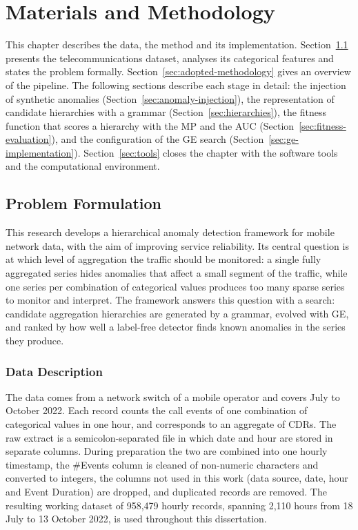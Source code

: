 \chapter{Materials and Methodology}
\label{chap:methodology}

This chapter describes the data, the method and its implementation.
Section~\ref{sec:problem-formulation} presents the telecommunications dataset, analyses its categorical features and states the problem formally.
Section~\ref{sec:adopted-methodology} gives an overview of the pipeline.
The following sections describe each stage in detail: the injection of synthetic anomalies (Section~\ref{sec:anomaly-injection}), the representation of candidate hierarchies with a grammar (Section~\ref{sec:hierarchies}), the fitness function that scores a hierarchy with the \ac{MP} and the \ac{AUC} (Section~\ref{sec:fitness-evaluation}), and the configuration of the \ac{GE} search (Section~\ref{sec:ge-implementation}).
Section~\ref{sec:tools} closes the chapter with the software tools and the computational environment.

\section{Problem Formulation}
\label{sec:problem-formulation}

This research develops a hierarchical anomaly detection framework for mobile network data, with the aim of improving service reliability.
Its central question is at which level of aggregation the traffic should be monitored: a single fully aggregated series hides anomalies that affect a small segment of the traffic, while one series per combination of categorical values produces too many sparse series to monitor and interpret.
The framework answers this question with a search: candidate aggregation hierarchies are generated by a grammar, evolved with \ac{GE}, and ranked by how well a label-free detector finds known anomalies in the series they produce.

\subsection{Data Description}

The data comes from a network switch of a mobile operator and covers July to October 2022.
Each record counts the call events of one combination of categorical values in one hour, and corresponds to an aggregate of \ac{CDR}s.
The raw extract is a semicolon-separated file in which date and hour are stored in separate columns.
During preparation the two are combined into one hourly timestamp, the \#Events column is cleaned of non-numeric characters and converted to integers, the columns not used in this work (data source, date, hour and Event Duration) are dropped, and duplicated records are removed.
The resulting working dataset of 958{,}479 hourly records, spanning 2{,}110 hours from 18 July to 13 October 2022, is used throughout this dissertation.

